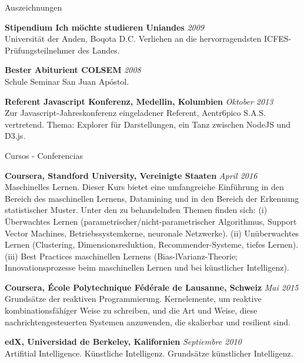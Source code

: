 \documentclass[spanish]{resume} %
\begin{document}
\begin{rSection}{Auszeichnungen}

{\bf Stipendium Ich m{\"o}chte studieren Uniandes} \hfill {\em 2009} \\
Universit{\"a}t der Anden, Boqota D.C. 
Verliehen an die hervorragendsten ICFES-Pr{\"u}fungsteilnehmer des Landes.

{\bf Bester Abiturient COLSEM} \hfill {\em 2008} \\
Schule Seminar San Juan Ap\'ostol.

{\bf Referent Javascript Konferenz, Medellin, Kolumbien} \hfill {\em Oktober 2013} \\
Zur Javascript-Jahreskonferenz eingeladener Referent, Aentr6pico S.A.S. vertretend. 
Thema: Explorer f{\"u}r Darstellungen, ein Tanz zwischen NodeJS und D3.js.

\end{rSection}


\begin{rSection}{Cursos - Conferencias}


{\bf Coursera, Standford University, Vereinigte Staaten} \hfill {\em April 2016} \\
Maschinelles Lernen. Dieser Kurs bietet eine umfangreiche Einf{\"u}hrung in den Bereich des maschinellen Lernens, Datamining und in den Bereich der Erkennung statistischer Muster. Unter den zu behandelnden Themen finden sich: (i) {\"U}berwachtes Lernen (parametrischer/nicht-parametrischer Algorithmus, Support Vector Machines, Betriebssystemkerne, neuronale Netzwerke). (ii) Un{\"u}berwachtes Lernen (Clustering, Dimensionsreduktion, Recommender-Systeme, tiefes Lernen). (iii) Best Practices maschinellen Lernens (Bias-lVarianz-Theorie; Innovationsprozesse beim maschinellen Lernen und bei k{\"u}nstlicher Intelligenz).

{\bf Coursera, \'Ecole Polytechnique F\'ed\'erale de Lausanne, Schweiz} \hfill {\em Mai 2015} \\
Grunds{\"a}tze der reaktiven Programmierung. Kernelemente, um reaktive kombinationsfähiger Weise zu schreiben, und die Art und Weise, diese nachrichtengesteuerten Systemen anzuwenden, die skalierbar und resilient sind.

{\bf edX, Universidad de Berkeley, Kalifornien} \hfill {\em Septiembre 2010} \\
Artifitial Intelligence.
K{\"u}nstliche Intelligenz. Grunds{\"a}tze k{\"u}nstlicher Intelligenz.

\end{rSection}
\end{document}
